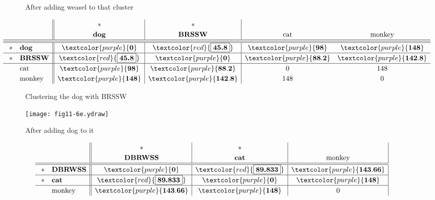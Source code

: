 \documentclass[bluish,slideColor,colorBG,pdf]{prosper}
\begin{document}
\begin{slide}[Replace]{After adding weasel to that cluster}
\bigskip

\noindent
\[
\renewcommand{\arraystretch}{1.2}
\hspace*{0in}\hspace{-1.0in}\begin{array}{c l || c | c | c c}
   &   &      *       &      *         &                   &            \\
   &        & {\rm \bf dog} & {\rm \bf BRSSW} & {\rm cat} & {\rm monkey}\\
\hline
\hline
\hline
~*& {\rm \bf dog}     &    \textcolor{purple}{\bf 0} & \textcolor{red}{\fbox{\bf 45.8}} & \textcolor{purple}{\bf 98} &\textcolor{purple}{\bf 148}\\
\hline
~*& {\rm \bf BRSSW}   &   \textcolor{red}{\fbox{\bf 45.8}} &  \textcolor{purple}{\bf 0} & \textcolor{purple}{\bf 88.2} &\textcolor{purple}{\bf 142.8}\\
\hline
  & {\rm cat}     &   \textcolor{purple}{\bf 98} & \textcolor{purple}{\bf 88.2} & 0 &148\\
  & {\rm monkey}  &  \textcolor{purple}{\bf 148} &\textcolor{purple}{\bf 142.8} & 148 &  0
\end{array}
\]

\end{slide}

\begin{slide}[Replace]{Clustering the dog with BRSSW}

\centerline{\texttt{[image: fig11-6e.ydraw]}}

\end{slide}

\begin{slide}[Replace]{After adding dog to it}
\bigskip

\noindent
\[
\renewcommand{\arraystretch}{1.2}
\hspace*{0in}\hspace{-1.2in}\begin{array}{c l || c | c | c |}
   &   &      *       &      *         &            \\
   &         & {\rm \bf DBRWSS} & {\rm \bf cat} & {\rm monkey}\\
\hline
\hline
~*& {\rm \bf DBRWSS}   &   \textcolor{purple}{\bf 0} & \textcolor{red}{\fbox{\bf 89.833}} &\textcolor{purple}{\bf 143.66}\\
\hline
~*& {\rm \bf cat}     &   \textcolor{red}{\fbox{\bf 89.833}} & \textcolor{purple}{\bf 0} &\textcolor{purple}{\bf 148}\\
\hline
  & {\rm monkey}  &  \textcolor{purple}{\bf 143.66} & \textcolor{purple}{\bf 148} &  0
\end{array}
\]

\end{slide}
\end{document}
